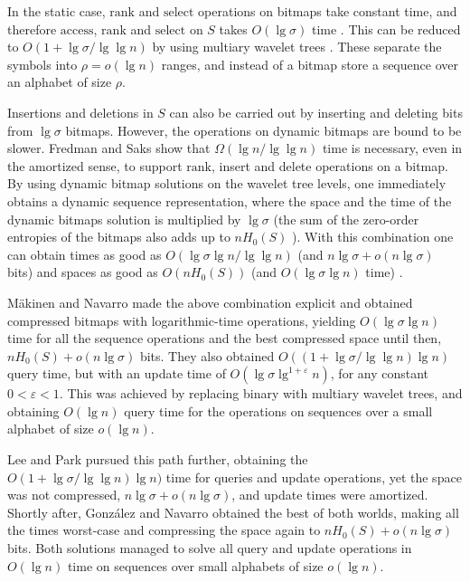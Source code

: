 \documentclass[11pt]{article}
\def\idrm#1{\ensuremath{\mathrm{#1}}}
\newcommand{\ra}{\idrm{rank}}
\newcommand{\sel}{\idrm{select}}
\newcommand{\acc}{\idrm{access}}
\newcommand{\eps}{\varepsilon}
\begin{document}
In the static case, $\ra$ and $\sel$ operations on bitmaps take constant time,
and therefore $\acc$, $\ra$ and $\sel$ on $S$ takes $O(\lg\sigma)$ time
\cite{GGV03}. This can be reduced to $O(1+\lg\sigma/\lg\lg n)$ by using
multiary wavelet trees \cite{FMMN07}. These separate the symbols into
$\rho=o(\lg n)$ ranges, and instead of a bitmap store a sequence over an 
alphabet of size $\rho$. 

Insertions and deletions in $S$ can also be carried out by inserting and 
deleting bits from $\lg\sigma$ bitmaps. However, the operations on dynamic 
bitmaps are bound to be slower. Fredman and Saks \cite{FS89} show that 
$\Omega(\lg n /\lg\lg n)$ time is necessary, even in the amortized sense, to 
support $\ra$, insert and delete operations on a bitmap. By using dynamic 
bitmap solutions \cite{HSS03,CHL04,BB04,CHLS07,HSS11} on the wavelet tree
levels, one immediately obtains a dynamic sequence representation, 
where the space and the time of the dynamic bitmaps
solution is multiplied by $\lg\sigma$ (the sum of the zero-order entropies of
the bitmaps also adds up to $nH_0(S)$ \cite{GGV03}). With this combination one
can obtain times as good as $O(\lg\sigma\lg n /\lg\lg n)$ (and $n\lg\sigma +
o(n\lg\sigma)$ bits) \cite{CHLS07} and spaces as good as $O(nH_0(S))$ 
(and $O(\lg\sigma\lg n)$ time) \cite{BB04}.

M\"akinen and Navarro \cite{MN06,MN08} made the above combination explicit
and obtained compressed bitmaps with logarithmic-time operations, yielding
$O(\lg\sigma \lg n)$ time for all the sequence operations and the best
compressed space until then, $nH_0(S)+o(n\lg\sigma)$ bits. 
They also obtained $O((1+\lg\sigma/\lg\lg n)\lg n)$ query time, but with
an update time of $O(\lg\sigma \lg^{1+\eps} n)$, for any constant $0<\eps<1$.
This was achieved by replacing binary with multiary wavelet trees, and
obtaining $O(\lg n)$ query time for the operations on sequences over a small
alphabet of size $o(\lg n)$.

Lee and Park \cite{LP07,LP09} pursued this path further, obtaining the
$O(1+\lg\sigma/\lg\lg n)\lg n)$ time for queries and update
operations, yet the space was not compressed, $n\lg\sigma+o(n\lg\sigma)$,
and update times were amortized.
Shortly after, Gonz\'alez and Navarro \cite{GN08,GN09} obtained the best
of both worlds, making all the times worst-case and compressing the space
again to $nH_0(S)+o(n\lg\sigma)$ bits. Both solutions managed to solve all
query and update operations in $O(\lg n)$ time on sequences over small
alphabets of size $o(\lg n)$.
\end{document}
